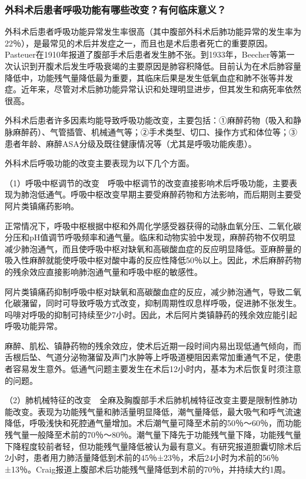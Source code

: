 \subsubsection{外科术后患者呼吸功能有哪些改变？有何临床意义？}

外科术后患者呼吸功能异常发生率很高（其中腹部外科术后肺功能异常的发生率为22％），是最常见的术后并发症之一，而且也是术后患者死亡的重要原因。Pasteuer在1910年报道了腹部手术后患者发生肺不张。到1933年，Beecher等第一次认识到开腹术后发生呼吸衰竭的主要原因是肺容积降低。目前认为在术后肺容量降低中，功能残气量降低最为重要，其临床后果是发生低氧血症和肺不张等并发症。近年来，尽管对术后肺功能异常认识和处理明显进步，但其发生和病死率依然很高。

外科术后患者许多因素均能导致呼吸功能改变，主要包括：①麻醉药物（吸入和静脉麻醉药）、气管插管、机械通气等；②手术类型、切口、操作方式和体位等；③患者年龄、麻醉ASA分级及既往健康情况等（尤其是呼吸功能疾患）。

外科术后呼吸功能的改变主要表现为以下几个方面。

（1）呼吸中枢调节的改变　呼吸中枢调节的改变直接影响术后呼吸功能，主要表现为肺泡低通气。呼吸中枢改变早期主要受麻醉药物和方法影响，而后期则主要受阿片类镇痛药影响。

正常情况下，呼吸中枢根据中枢和外周化学感受器获得的动脉血氧分压、二氧化碳分压和pH值调节呼吸频率和通气量。临床和动物实验中发现，麻醉药物不仅明显减少肺泡通气，而且使呼吸中枢对缺氧和高碳酸血症的反应明显降低。亚麻醉量的吸入性麻醉就能使呼吸中枢对酸中毒的反应性降低50％以上。因此，术后麻醉药物的残余效应直接影响肺泡通气量和呼吸中枢的敏感性。

阿片类镇痛药抑制呼吸中枢对缺氧和高碳酸血症的反应，减少肺泡通气，导致二氧化碳潴留，同时可导致呼吸方式改变，抑制周期性叹息样呼吸，促进肺不张发生。吗啡对呼吸的抑制可持续至少7小时。因此，术后阿片类镇静药的残余效应能引起呼吸功能异常。

麻醉、肌松、镇静药物的残余效应，使术后近期一段时间内易出现低通气倾向，而舌根后坠、气道分泌物潴留及声门水肿等上呼吸道梗阻因素常加重通气不足，使患者容易发生意外。低通气问题主要发生在术后12小时内，基本为术后恢复时须注意的问题。

（2）肺机械特征的改变　全麻及胸腹部手术后肺机械特征改变主要是限制性肺功能改变。表现为功能残气量和肺活量明显降低，潮气量降低，最大吸气和呼气流速降低，呼吸浅快和死腔通气量增加。术后潮气量可降至术前的50％～60％，而功能残气量一般降至术前的70％～80％。潮气量下降先于功能残气量下降，功能残气量下降程度较前者轻，但功能残气量降低被认为最有意义。有研究报道胆囊切除术后2小时，患者用力肺活量降低到术前的45％±23％，术后24小时为术前的56％±13％。Craig报道上腹部术后功能残气量降低到术前的70％，并持续大约1周。

